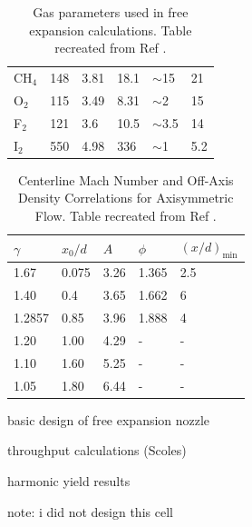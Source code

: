 \begin{table}[]
\begin{tabular}{llllll}
		CH$_4$ & 148                & 3.81                & 18.1                                    & $\sim$15  & 21                                                               \\
		O$_2$  & 115                & 3.49                & 8.31                                    & $\sim$2   & 15                                                               \\
		F$_2$  & 121                & 3.6                 & 10.5                                    & $\sim$3.5 & 14                                                               \\
		I$_2$  & 550                & 4.98                & 336                                     & $\sim$1   & 5.2                                                              \\ \hline
	\end{tabular}
	\caption{Gas parameters used in free expansion calculations. Table recreated from Ref \cite{millerFreeJetSources1988}.}
	\label{tbl:Scoles_gas_params2.1}
\end{table}

\begin{table}[]
	\centering
	\begin{tabular}{lllll}
		\hline
		$\gamma$ & $x_0/d$ & $A$  & $\phi$ & $(x/d)_{\text{min}}$ \\ \hline
		1.67     & 0.075   & 3.26 & 1.365  & 2.5                  \\
		1.40     & 0.4     & 3.65 & 1.662  & 6                    \\
		1.2857   & 0.85    & 3.96 & 1.888  & 4                    \\
		1.20     & 1.00    & 4.29 & -      & -                    \\
		1.10     & 1.60    & 5.25 & -      & -                    \\
		1.05     & 1.80    & 6.44 & -      & -                    \\ \hline
	\end{tabular}
	\caption{Centerline Mach Number and Off-Axis Density Correlations for Axisymmetric Flow. Table recreated from Ref \cite{millerFreeJetSources1988}.}
	\label{tbl:Scoles_mach_params}
\end{table}

basic design of free expansion nozzle

throughput calculations (Scoles)

harmonic yield results

note: i did not design this cell

